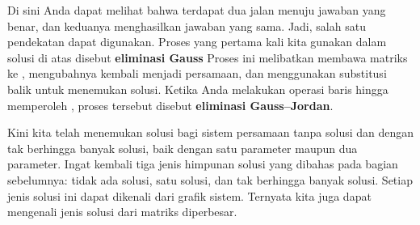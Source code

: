 Di sini Anda dapat melihat bahwa terdapat dua jalan menuju jawaban yang benar, dan keduanya menghasilkan
jawaban yang sama. Jadi, salah satu pendekatan dapat digunakan. Proses yang pertama kali kita gunakan dalam solusi di atas disebut \textbf{eliminasi Gauss}
Proses ini melibatkan membawa matriks ke \ef, mengubahnya kembali menjadi persamaan, dan menggunakan substitusi balik untuk menemukan solusi.
Ketika Anda melakukan operasi baris hingga memperoleh \rref, proses tersebut
disebut \textbf{eliminasi Gauss--Jordan}. 

Kini kita telah menemukan solusi bagi sistem persamaan tanpa solusi dan dengan tak berhingga banyak solusi, baik dengan satu parameter maupun dua parameter.
Ingat kembali tiga jenis himpunan solusi yang dibahas pada bagian sebelumnya: tidak ada solusi, satu solusi, dan tak berhingga banyak solusi. Setiap
jenis solusi ini dapat dikenali dari grafik sistem. Ternyata kita juga dapat mengenali jenis solusi
dari \rref \;matriks diperbesar.

